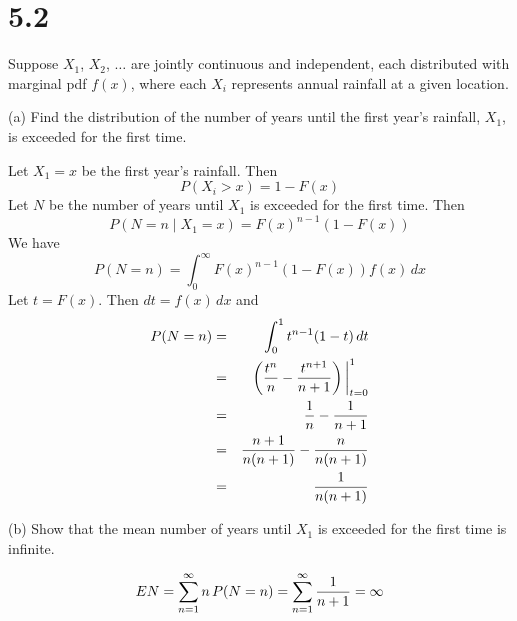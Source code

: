 \section*{5.2}
Suppose $X_1$, $X_2$, $\ldots$ are jointly continuous and independent,
each distributed with marginal pdf $f(x)$, where each $X_i$
represents annual rainfall at a given location.

\bigskip
\noindent
(a) Find the distribution of the number of years until the first
year's rainfall, $X_1$, is exceeded for the first time.

\bigskip
\noindent
Let $X_1=x$ be the first year's rainfall. Then
$$P(X_i>x)=1-F(x)$$
Let $N$ be the number of years until $X_1$ is exceeded for the first
time. Then
$$P(N=n\mid X_1=x)=F(x)^{n-1}(1-F(x))$$
We have
$$P(N=n)=\int_0^\infty F(x)^{n-1}(1-F(x))f(x)\,dx$$
Let $t=F(x)$. Then $dt=f(x)\,dx$ and
\begin{eqnarray*}
P(N=n)&=&\int_0^1 t^{n-1}(1-t)\,dt\\
&=&\left({t^n\over n}-{t^{n+1}\over n+1}\right)\bigg|_{t=0}^1\\
&=&{1\over n}-{1\over n+1}\\
&=&{n+1\over n(n+1)}-{n\over n(n+1)}\\
&=&{1\over n(n+1)}
\end{eqnarray*}

\bigskip
\noindent
(b) Show that the mean number of years until $X_1$ is exceeded for
the first time is infinite.

$$EN=\sum_{n=1}^\infty n\,P(N=n)
=\sum_{n=1}^\infty{1\over n+1}=\infty$$

